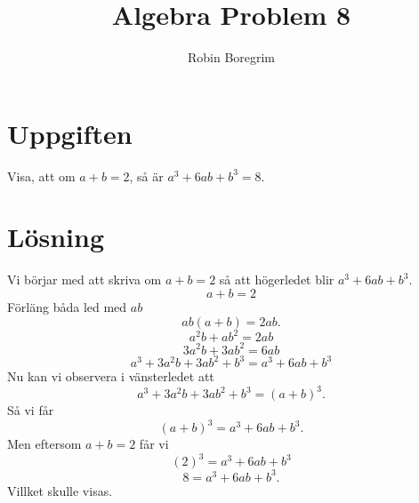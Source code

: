 \documentclass[11pt]{article}
\begin{document}
\title{Algebra Problem 8}
\author{Robin Boregrim}
\maketitle
\renewcommand{\contentsname}{Innehållsförteckning}
\tableofcontents
\newpage
\section{Uppgiften}
Visa, att om $a+b =2$, så är $a^3 + 6ab + b^3 = 8$.
\section{Lösning}
Vi börjar med att skriva om $a+b =2$ så att högerledet blir $a^3 + 6ab + b^3$.
$$a+b =2$$
Förläng båda led med $ab$
$$ab(a+b) = 2ab.$$
$$a^2b + ab^2 = 2ab$$
$$3a^2b + 3ab^2 = 6ab$$
$$a^3 + 3a^2b + 3ab^2 + b^3 = a^3 + 6ab + b^3$$
Nu kan vi observera i vänsterledet att $$a^3 + 3a^2b + 3ab^2 + b^3 = (a+b)^3.$$
Så vi får
$$(a+b)^3 = a^3 + 6ab + b^3.$$
Men eftersom $a+b = 2$ får vi
$$(2)^3 = a^3 + 6ab + b^3$$
$$8 = a^3 + 6ab + b^3.$$
Villket skulle visas.
\end{document}

